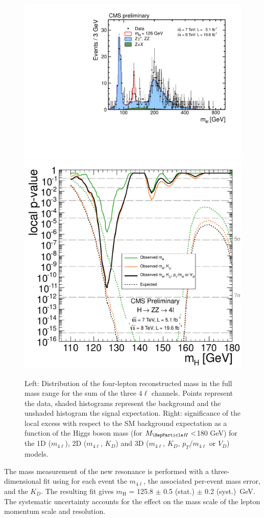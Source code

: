 \documentclass{cimento}
\newcommand{\mH}{\ensuremath{m_{\mathrm{H}}}\xspace}
\newcommand{\MH}{\ensuremath{M_{\PH}}}
\begin{document}
\begin{figure}[th!]
\begin{center}
\centerline{
\includegraphics[width=0.5\linewidth,height=0.50\textwidth]{ZZMass_7Plus8TeV_70-1000_3GeV}
\includegraphics[width=0.5\linewidth,height=0.50\textwidth]{Pvals_PLP_lowMass_1D2D3D_Final3_no2l2tau_7p8sep}
}
\caption{Left: Distribution of the four-lepton reconstructed mass in the full mass range for the sum of 
the three $4\ell$ channels. Points represent the data, shaded
histograms represent the background and the unshaded histogram the
signal expectation.  Right: significance of the local excess with
respect to the SM background expectation as a function of the Higgs
boson mass (for $\MH<$180 GeV) for the 1D ($m_{4\ell}$), 2D
($m_{4\ell}$, $K_D$) and 3D ($m_{4\ell}$, $K_D$, $p_{T} /m_{4\ell}$ or
$V_D$) models.  }
\label{fig:hzz1}
\end{center}
\end{figure}

The mass measurement of the new resonance is performed with a
three-dimensional fit using for each event the $m_{4\ell}$, the
associated per-event mass error, and the $K_D$.  The resulting fit
gives $\mH$ = 125.8 $\pm$ 0.5 (stat.) $\pm$ 0.2 (syst.)~GeV.  The
systematic uncertainty accounts for the effect on the mass scale of
the lepton momentum scale and resolution.
\end{document}
